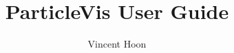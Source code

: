 \documentclass[12pt]{article}
\begin{document}
\title{ParticleVis User Guide}
\author{Vincent Hoon}
\date{}
\maketitle
\tableofcontents

\end{document}
